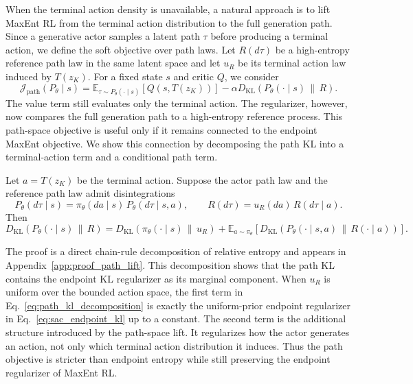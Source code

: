 \documentclass[11pt]{article}
\begin{document}
When the terminal action density is unavailable, a natural approach is to lift MaxEnt RL from the terminal action distribution to the full generation path. Since a generative actor samples a latent path $\tau$ before producing a terminal action, we define the soft objective over path laws. Let $R(d\tau)$ be a high-entropy reference path law in the same latent space and let $u_R$ be its terminal action law induced by $T(z_K)$. For a fixed state $s$ and critic $Q$, we consider
\begin{equation}
  \mathcal J_{\mathrm{path}}(P_\theta \mid s)
  =
  \mathbb E_{\tau\sim P_\theta(\cdot\mid s)}
  \left[
    Q(s,T(z_K))
  \right]
  -
  \alpha
  D_{\mathrm{KL}}
  \left(
    P_\theta(\cdot\mid s)
    \,\|\,R
  \right).
  \label{eq:path_soft_objective}
\end{equation}
The value term still evaluates only the terminal action. The regularizer, however, now compares the full generation path to a high-entropy reference process. This path-space objective is useful only if it remains connected to the endpoint MaxEnt objective. We show this connection by decomposing the path KL into a terminal-action term and a conditional path term.

\begin{proposition}
Let $a=T(z_K)$ be the terminal action. Suppose the actor path law and the reference path law admit disintegrations
\begin{equation}
  P_\theta(d\tau\mid s)
  =
  \pi_\theta(da\mid s)\,P_\theta(d\tau\mid s,a),
  \qquad
  R(d\tau)
  =
  u_R(da)\,R(d\tau\mid a).
\end{equation}
Then
\begin{equation}
  D_{\mathrm{KL}}
  \left(
    P_\theta(\cdot\mid s)
    \,\|\,R
  \right)
  =
  D_{\mathrm{KL}}
  \left(
    \pi_\theta(\cdot\mid s)
    \,\|\,u_R
  \right)
  +
  \mathbb E_{a\sim\pi_\theta}
  \left[
    D_{\mathrm{KL}}
    \left(
      P_\theta(\cdot\mid s,a)
      \,\|\,R(\cdot\mid a)
    \right)
  \right].
  \label{eq:path_kl_decomposition}
\end{equation}
\end{proposition}

The proof is a direct chain-rule decomposition of relative entropy and appears in Appendix~\ref{app:proof_path_lift}. This decomposition shows that the path KL contains the endpoint KL regularizer as its marginal component. When $u_R$ is uniform over the bounded action space, the first term in Eq.~\eqref{eq:path_kl_decomposition} is exactly the uniform-prior endpoint regularizer in Eq.~\eqref{eq:sac_endpoint_kl} up to a constant. The second term is the additional structure introduced by the path-space lift. It regularizes how the actor generates an action, not only which terminal action distribution it induces. Thus the path objective is stricter than endpoint entropy while still preserving the endpoint regularizer of MaxEnt RL.
\end{document}

